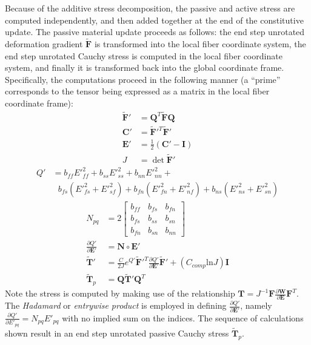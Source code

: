 Because of the additive stress decomposition, the passive and active stress are computed independently, and then added together at the end of the constitutive update. The passive material update proceeds as follows: the end step unrotated deformation gradient $\tilde{\bm{F}}$ is transformed into the local fiber coordinate system, the end step unrotated Cauchy stress is computed in the local fiber coordinate system, and finally it is transformed back into the global coordinate frame. Specifically, the computations proceed in the following manner (a ``prime'' corresponds to the tensor being expressed as a matrix in the local fiber coordinate frame):
\begin{align}
\tilde{\bm{F}}' &= \bm{Q}^T\tilde{\bm{F}}\bm{Q} \\
\bm{C}' &= \tilde{\bm{F}}'^T \tilde{\bm{F}}' \\
\bm{E}' &= \frac{1}{2}(\bm{C}' - \bm{I}) \\
J  &= \det{\tilde{\bm{F}}'}
\end{align}
\begin{equation}
\begin{aligned}
Q' &= b_{ff} E'^2_{ff} + b_{ss} E'^2_{ss} + b_{nn} E'^2_{nn} + \\
&\text{\ \ \ }b_{fs}\left(E'^2_{fs} + E'^2_{sf}\right) + b_{fn}\left(E'^2_{fn} + E'^2_{nf}\right) + b_{ns}\left(E'^2_{ns} + E'^2_{sn}\right)
\end{aligned}
\end{equation}
\begin{align}
N_{pq} &= 2 \left[\begin{array} {ccc} b_{ff} & b_{fs} & b_{fn} \\ b_{fs} & b_{ss} & b_{sn} \\ b_{fn} & b_{sn} & b_{nn} \end{array} \right] \\
\frac{\partial Q'}{\partial \bm{E}'} &= \bm{N} \circ \bm{E}' \\
\tilde{\bm{T}}' &= \frac{C}{2J}e^{Q'}\tilde{\bm{F}}'^T\frac{\partial{Q'}}{\partial{\bm{E}'}}\tilde{\bm{F}}' + (C_{comp}\text{ln}J)\bm{I} \\
\tilde{\bm{T}}_p &= \bm{Q} \tilde{\bm{T}}' \bm{Q}^T
\end{align}
Note the stress is computed by making use of the relationship $\bm{T} = J^{-1}\bm{F}\frac{\partial\bm{W}}{\partial \bm{E}} \bm{F}^T$. The \textit{Hadamard} or \textit{entrywise product} is employed in defining $\frac{\partial Q'}{\partial \bm{E}'}$, namely $\frac{\partial Q'}{\partial E'_{pq}} = N_{pq}E'_{pq}$ with no implied sum on the indices. The sequence of calculations shown result in an end step unrotated passive Cauchy stress $\tilde{\bm{T}}_p$.

